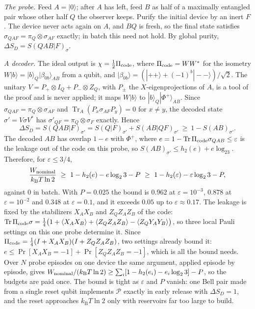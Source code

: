 \documentclass[11pt]{article}
\theoremstyle{definition}
\theoremstyle{remark}
\newcommand{\Tr}{\operatorname{Tr}}
\newcommand{\kB}{k_{\mathrm B}}
\begin{document}
\emph{The probe.} Feed $A=|0\rangle$; after $A$ has left, feed $B$ as half of a maximally entangled pair whose other half $Q$ the observer keeps. Purify the initial device by an inert $F$. The device never acts again on $A$, and $BQ$ is fresh, so the final state satisfies $\sigma_{QAF}=\pi_Q\otimes\sigma_{AF}$ exactly; in batch this need not hold. By global purity, $\Delta S_D=S(QAB|F)_\sigma$.

\emph{A decoder.} The ideal output is $\chi=\tfrac12\Pi_{\rm code}$, where $\Pi_{\rm code}=WW^*$ for the isometry $W|b\rangle=|b\rangle_Q|\beta_{0b}\rangle_{AB}$ from a qubit, and $|\beta_{0b}\rangle=(|{+}{+}\rangle+(-1)^b|{-}{-}\rangle)/\sqrt2$. The unitary $V=P_+\otimes I_Q+P_-\otimes Z_Q$, with $P_\pm$ the $X$-eigenprojections of $A$, is a tool of the proof and is never applied; it maps $W|b\rangle$ to $|b\rangle_Q|\Phi^+\rangle_{AB}$. Since $\sigma_{QAF}=\pi_Q\otimes\sigma_{AF}$ and $\Tr_A(P_x\sigma_{AF}P_y)=0$ for $x\ne y$, the decoded state $\sigma'=V\sigma V^*$ has $\sigma'_{QF}=\pi_Q\otimes\sigma_F$ exactly. Hence
\[
\Delta S_D=S(QAB|F)_{\sigma'}=S(Q|F)_{\sigma'}+S(AB|QF)_{\sigma'}\ \ge\ 1-S(AB)_{\sigma'}.
\]
The decoded $AB$ has overlap $1-e$ with $\Phi^+$, where $e=1-\Tr\Pi_{\rm code}\sigma_{QAB}\le\varepsilon$ is the leakage out of the code on this probe, so $S(AB)_{\sigma'}\le h_2(e)+e\log_23$. Therefore, for $\varepsilon\le3/4$,
\[
\frac{W_{\rm nominal}}{\kB T\ln2}\ \ge\ 1-h_2(e)-e\log_23-P\ \ge\ 1-h_2(\varepsilon)-\varepsilon\log_23-P,
\]
against $0$ in batch. With $P=0.025$ the bound is $0.962$ at $\varepsilon=10^{-3}$, $0.878$ at $\varepsilon=10^{-2}$ and $0.348$ at $\varepsilon=0.1$, and it exceeds $0.05$ up to $\varepsilon\approx0.17$. The leakage is fixed by the stabilizers $X_AX_B$ and $Z_QZ_AZ_B$ of the code: $\Tr\Pi_{\rm code}\sigma=\tfrac14\bigl(1+\langle X_AX_B\rangle+\langle Z_QZ_AZ_B\rangle-\langle Z_QY_AY_B\rangle\bigr)$, so three local Pauli settings on this one probe determine it. Since $\Pi_{\rm code}=\tfrac14(I+X_AX_B)(I+Z_QZ_AZ_B)$, two settings already bound it: $e\le\Pr[X_AX_B=-1]+\Pr[Z_QZ_AZ_B=-1]$, which is all the bound needs. Over $N$ probe episodes on one device the same argument, applied episode by episode, gives $W_{\rm nominal}/(\kB T\ln2)\ge\sum_i[1-h_2(e_i)-e_i\log_23]-P$, so the budgets are paid once. The bound is tight as $\varepsilon$ and $P$ vanish: one Bell pair made from a single reset qubit implements $\mathcal P$ exactly in early release with $\Delta S_D=1$, and the reset approaches $\kB T\ln2$ only with reservoirs far too large to build.
\end{document}

